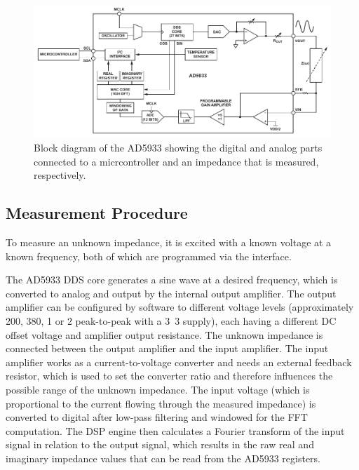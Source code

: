 \begin{figure}[htpb]
  \centering
    \includegraphics[width=\textwidth]{bilder/ad_block.pdf}
  \caption{Block diagram of the AD5933 showing the digital and analog parts connected to a micrcontroller
    and an impedance that is measured, respectively.}
  \label{fig:ad_block}
\end{figure}


\subsection{Measurement Procedure}

To measure an unknown impedance, it is excited with a known voltage at a known frequency, both of which are programmed
via the \iic{} interface.

The AD5933 DDS core generates a sine wave at a desired frequency, which is converted to analog and output by the
internal output amplifier. The output amplifier can be configured by software to different voltage levels
(approximately \unit{200}{\milli\volt}, \unit{380}{\milli\volt}, \unit{1}{\volt} or \unit{2}{\volt} peak-to-peak with
a \unit{3.3}{\volt} supply), each having a different DC offset voltage and amplifier output resistance.
The unknown impedance is connected between the output amplifier and the input amplifier. The input amplifier works as
a current-to-voltage converter and needs an external feedback resistor, which is used to set the converter ratio
and therefore influences the possible range of the unknown impedance.
The input voltage (which is proportional to the current flowing through the measured impedance) is converted to digital
after low-pass filtering and windowed for the FFT computation.
The DSP engine then calculates a Fourier transform of the input signal in relation to the output signal,
which results in the raw real and imaginary impedance values that can be read from the AD5933 registers.

